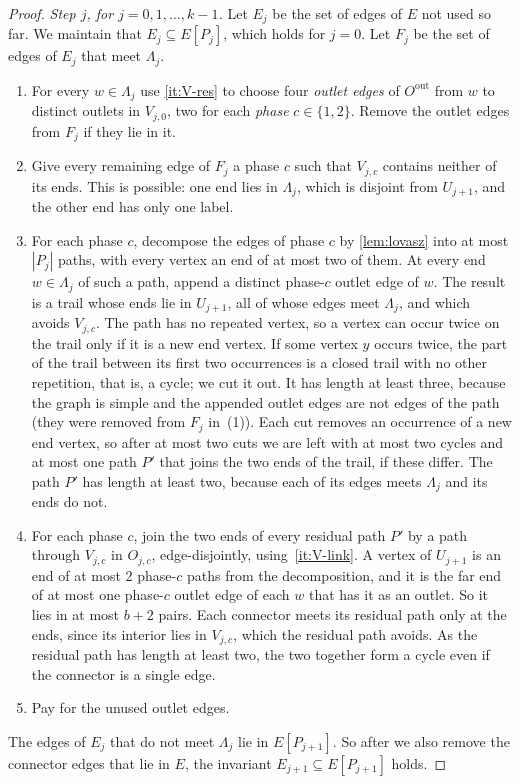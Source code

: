 \documentclass[11pt]{article}
\theoremstyle{definition}
\theoremstyle{remark}
\numberwithin{equation}{section}
\numberwithin{figure}{section}
\numberwithin{table}{section}
\begin{document}
\begin{proof}
\emph{Step $j$, for $j=0,1,\dots,k-1$.} Let $E_j$ be the set of edges of $E$
not used so far. We maintain that $E_j\subseteq E[P_j]$, which holds for
$j=0$. Let $F_j$ be the set of edges of $E_j$ that meet $\Lambda_j$.
\begin{enumerate}[label=(\arabic*),itemsep=2pt]
\item For every $w\in\Lambda_j$ use \ref{it:V-res} to choose four \emph{outlet edges}
of $O^{\mathrm{out}}$ from $w$ to distinct outlets in $V_{j,0}$, two for each
\emph{phase} $c\in\{1,2\}$. Remove the outlet edges from $F_j$ if they lie in
it.
\item Give every remaining edge of $F_j$ a phase $c$ such that $V_{j,c}$
contains neither of its ends. This is possible: one end lies in $\Lambda_j$,
which is disjoint from $U_{j+1}$, and the other end has only one label.
\item For each phase $c$, decompose the edges of phase $c$ by
\cref{lem:lovasz} into at most $|P_j|$ paths, with every vertex an end of at
most two of them. At every end $w\in\Lambda_j$ of such a path, append a
distinct phase-$c$ outlet edge of $w$. The result is a trail whose ends lie in
$U_{j+1}$, all of whose edges meet $\Lambda_j$, and which avoids $V_{j,c}$.
The path has no repeated vertex, so a vertex can occur twice on the trail only
if it is a new end vertex. If some vertex $y$ occurs twice, the part of the
trail between its first two occurrences is a closed trail with no other
repetition, that is, a cycle; we cut it out. It has length at least three,
because the graph is simple and the appended outlet edges are not edges of
the path (they were removed from $F_j$ in~(1)). Each cut removes an occurrence
of a new end vertex, so after at most two cuts we are left with at most two
cycles and at most one path $P'$ that joins the two ends of the trail, if these
differ. The path $P'$ has length at least two, because each of its edges meets
$\Lambda_j$ and its ends do not.
\item For each phase $c$, join the two ends of every residual path $P'$ by a
path through $V_{j,c}$ in $O_{j,c}$, edge-disjointly, using~\ref{it:V-link}. A
vertex of $U_{j+1}$ is an end of at most $2$ phase-$c$ paths from the
decomposition, and it is the far end of at most one phase-$c$ outlet edge of
each $w$ that has it as an outlet. So it lies in at most $b+2$ pairs. Each
connector meets its residual path only at the ends, since its interior lies in
$V_{j,c}$, which the residual path avoids. As the residual path has length at
least two, the two together form a cycle even if the connector is a single
edge.
\item Pay for the unused outlet edges.
\end{enumerate}
The edges of $E_j$ that do not meet $\Lambda_j$ lie in $E[P_{j+1}]$. So after
we also remove the connector edges that lie in $E$, the invariant
$E_{j+1}\subseteq E[P_{j+1}]$ holds.


\end{proof}
\end{document}
